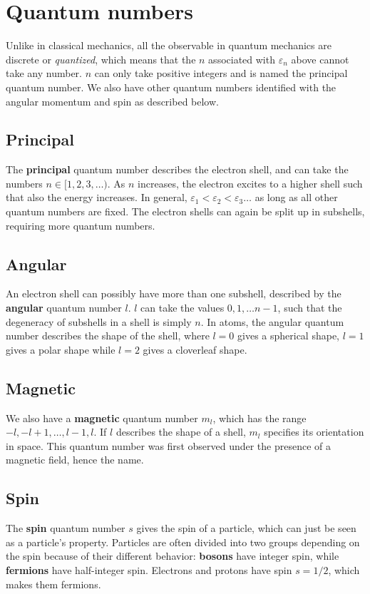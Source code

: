 \section{Quantum numbers}
Unlike in classical mechanics, all the observable in quantum mechanics are discrete or \textit{quantized}, which means that the $n$ associated with $\varepsilon_n$ above cannot take any number. $n$ can only take positive integers and is named the principal quantum number. We also have other quantum numbers identified with the angular momentum and spin as described below.

\subsection*{Principal}
The \textbf{principal} quantum number describes the electron shell, and can take the numbers $n\in[1,2,3,\hdots)$. As $n$ increases, the electron excites to a higher shell such that also the energy increases. In general, $\varepsilon_1<\varepsilon_2<\varepsilon_3\hdots$ as long as all other quantum numbers are fixed. The electron shells can again be split up in subshells, requiring more quantum numbers.

\subsection*{Angular}
An electron shell can possibly have more than one subshell, described by the \textbf{angular} quantum number $l$. $l$ can take the values $0,1,\hdots n-1$, such that the degeneracy of subshells in a shell is simply $n$. In atoms, the angular quantum number describes the shape of the shell, where $l=0$ gives a spherical shape, $l=1$ gives a polar shape while $l=2$ gives a cloverleaf shape. 

\subsection*{Magnetic}
We also have a \textbf{magnetic} quantum number $m_l$, which has the range $-l,-l+1,\hdots,l-1,l$. If $l$ describes the shape of a shell, $m_l$ specifies its orientation in space. This quantum number was first observed under the presence of a magnetic field, hence the name.

\subsection*{Spin}
The \textbf{spin} quantum number $s$ gives the spin of a particle, which can just be seen as a particle's property. Particles are often divided into two groups depending on the spin because of their different behavior: \textbf{bosons} have integer spin, while \textbf{fermions} have half-integer spin. Electrons and protons have spin $s=1/2$, which makes them fermions.

